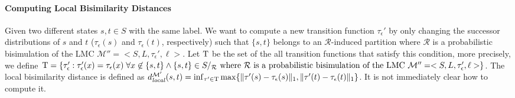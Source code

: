 \documentclass[a4paper,UKenglish,cleveref,autoref,thm-restate]{lipics-v2021}
\newcommand{\suchthat}{:}%
\newcommand{\glob}{\mathit{global}}
\newcommand{\local}{\mathit{local}}
\newcommand{\Hyp}{\mathcal{M}'}%
\newcommand{\tauHyp}{\tau_{\epsilon}}
\newcommand{\R}{\mathcal{R}}
\begin{document}

 \paragraph*{Computing Local Bisimilarity Distances}\label{subsubsection:computeLocalBisimilarityDistances}
Given two different states $s, t \in S$ with the same label. We want to compute a new transition function $\tauHyp'$ by only changing the successor distributions of $s$ and $t$ ($\tauHyp(s)$ and $\tauHyp(t)$, respectively) such that $\{s, t\}$ belongs to an $\R$-induced partition where $\R$ is a probabilistic bisimulation of the LMC $\Hyp' = <S, L, \tauHyp', \ell>$. Let ${\rm T}$ be the set of the all transition functions that satisfy this condition, more precisely, we define ${\rm T} = \{\tauHyp' \suchthat \tauHyp'(x) = \tauHyp(x) \; \forall x \not\in \{s, t\}  \land \{s, t\} \in S /_{\R} \text{ where } \R \text{ is a probabilistic bisimulation of the LMC } \Hyp' = <S, L, \tauHyp', \ell>\}$. The local bisimilarity distance is defined as $d_{\local}^{\Hyp}(s, t) = \textstyle\inf_{\tau' \in {\rm T}} \max\{\|\tau'(s) - \tauHyp(s)\|_1, \|\tau'(t) - \tauHyp(t)\|_1 \}$. It is not immediately clear how to compute it. %
\end{document}

